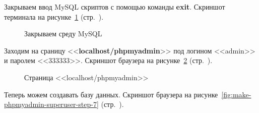 Закрываем ввод MySQL скриптов с помощью команды \textbf{exit}.
Скриншот терминала на рисунке~\ref{fig:make-phpmyadmin-superuser-step-5} (стр.~\pageref{fig:make-phpmyadmin-superuser-step-5}).

\begin{figure}[p]
    \caption{Закрываем среду MySQL}
    \label{fig:make-phpmyadmin-superuser-step-5}
\end{figure}

Заходим на сраницу <<\textbf{localhost/phpmyadmin}>> под логином <<admin>> и паролем <<333333>>. 
Скриншот браузера на рисунке~\ref{fig:make-phpmyadmin-superuser-step-6} (стр.~\pageref{fig:make-phpmyadmin-superuser-step-6}).

\begin{figure}[p]
    \caption{Страница <<localhost/phpmyadmin>>}
    \label{fig:make-phpmyadmin-superuser-step-6}
\end{figure}

Теперь можем создавать базу данных.
Скриншот браузера на рисунке~\ref{fig:make-phpmyadmin-superuser-step-7} (стр.~\pageref{fig:make-phpmyadmin-superuser-step-7}).

